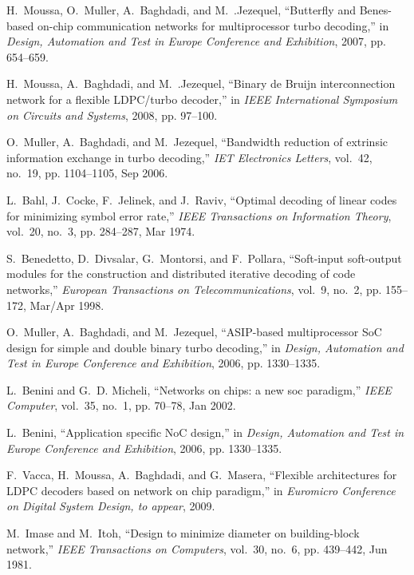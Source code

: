 \documentclass[10pt,twocolumn,journal]{IEEEtran}
\begin{document}
\begin{thebibliography}{10}
H.~Moussa, O.~Muller, A.~Baghdadi, and M.~.Jezequel, ``Butterfly and
  {B}enes-based on-chip communication networks for multiprocessor turbo
  decoding,'' in \emph{Design, Automation and Test in Europe Conference and
  Exhibition}, 2007, pp. 654--659.

H.~Moussa, A.~Baghdadi, and M.~.Jezequel, ``Binary de {B}ruijn interconnection
  network for a flexible {LDPC}/turbo decoder,'' in \emph{IEEE International
  Symposium on Circuits and Systems}, 2008, pp. 97--100.

O.~Muller, A.~Baghdadi, and M.~Jezequel, ``Bandwidth reduction of extrinsic
  information exchange in turbo decoding,'' \emph{IET Electronics Letters},
  vol.~42, no.~19, pp. 1104--1105, Sep 2006.

L.~Bahl, J.~Cocke, F.~Jelinek, and J.~Raviv, ``Optimal decoding of linear codes
  for minimizing symbol error rate,'' \emph{IEEE Transactions on Information
  Theory}, vol.~20, no.~3, pp. 284--287, Mar 1974.

S.~Benedetto, D.~Divsalar, G.~Montorsi, and F.~Pollara, ``Soft-input
  soft-output modules for the construction and distributed iterative decoding
  of code networks,'' \emph{European Transactions on Telecommunications},
  vol.~9, no.~2, pp. 155--172, Mar/Apr 1998.

O.~Muller, A.~Baghdadi, and M.~Jezequel, ``{ASIP}-based multiprocessor {SoC}
  design for simple and double binary turbo decoding,'' in \emph{Design,
  Automation and Test in Europe Conference and Exhibition}, 2006, pp.
  1330--1335.

L.~Benini and G.~D. Micheli, ``Networks on chips: a new soc paradigm,''
  \emph{IEEE Computer}, vol.~35, no.~1, pp. 70--78, Jan 2002.

L.~Benini, ``Application specific {NoC} design,'' in \emph{Design, Automation
  and Test in Europe Conference and Exhibition}, 2006, pp. 1330--1335.

F.~Vacca, H.~Moussa, A.~Baghdadi, and G.~Masera, ``Flexible architectures for
  {LDPC} decoders based on network on chip paradigm,'' in \emph{Euromicro
  Conference on Digital System Design, to appear}, 2009.

M.~Imase and M.~Itoh, ``Design to minimize diameter on building-block
  network,'' \emph{IEEE Transactions on Computers}, vol.~30, no.~6, pp.
  439--442, Jun 1981.


\end{thebibliography}
\end{document}
